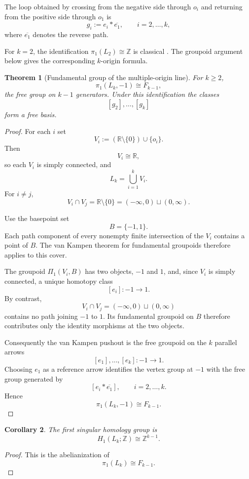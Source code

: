 \documentclass[11pt]{article}
\theoremstyle{plain}
\newtheorem{theorem}{Theorem}[section]
\newtheorem{corollary}[theorem]{Corollary}
\theoremstyle{definition}
\begin{document}
The loop obtained by crossing from the negative side through $o_i$ and
returning from the positive side through $o_1$ is
\[
g_i
:=
e_i * \overline{e_1},
\qquad
i=2,\ldots,k,
\]
where $\overline{e_1}$ denotes the reverse path.

For $k=2$, the identification $\pi_1(L_2)\cong\mathbb Z$ is classical
\citep{CalcutGompfMcCarthy2012}.  The groupoid argument below gives the corresponding
$k$-origin formula.

\begin{theorem}[Fundamental group of the multiple-origin line]
\label{thm:pi1-Lk}
For $k\geq2$,
\[
\pi_1(L_k,-1)
\cong
F_{k-1},
\]
the free group on $k-1$ generators.  Under this identification the
classes
\[
[g_2],\ldots,[g_k]
\]
form a free basis.
\end{theorem}

\begin{proof}
For each $i$ set
\[
V_i
:=
(\mathbb R\setminus\{0\})\cup\{o_i\}.
\]
Then
\[
V_i\cong\mathbb R,
\]
so each $V_i$ is simply connected, and
\[
L_k=\bigcup_{i=1}^kV_i.
\]
For $i\neq j$,
\[
V_i\cap V_j
=
\mathbb R\setminus\{0\}
=
(-\infty,0)\sqcup(0,\infty).
\]

Use the basepoint set
\[
B=\{-1,1\}.
\]
Each path component of every nonempty finite intersection of the $V_i$
contains a point of $B$.  The van Kampen theorem for fundamental
groupoids therefore applies to this cover.

The groupoid $\Pi_1(V_i,B)$ has two objects, $-1$ and $1$, and, since
$V_i$ is simply connected, a unique homotopy class
\[
[e_i]:-1\longrightarrow1.
\]
By contrast,
\[
V_i\cap V_j
=
(-\infty,0)\sqcup(0,\infty)
\]
contains no path joining $-1$ to $1$.  Its fundamental groupoid on $B$
therefore contributes only the identity morphisms at the two objects.

Consequently the van Kampen pushout is the free groupoid on the $k$
parallel arrows
\[
[e_1],\ldots,[e_k]:
-1\longrightarrow1.
\]
Choosing $e_1$ as a reference arrow identifies the vertex group at
$-1$ with the free group generated by
\[
[e_i*\overline{e_1}],
\qquad
i=2,\ldots,k.
\]
Hence
\[
\pi_1(L_k,-1)\cong F_{k-1}.
\]
\end{proof}

\begin{corollary}
\label{cor:H1-Lk}
The first singular homology group is
\[
H_1(L_k;\mathbb Z)
\cong
\mathbb Z^{k-1}.
\]
\end{corollary}

\begin{proof}
This is the abelianization of
\[
\pi_1(L_k)\cong F_{k-1}.
\]
\end{proof}
\end{document}
